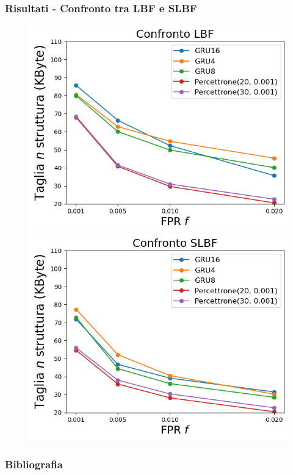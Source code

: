 \documentclass{beamer}
\begin{document}
\begin{frame}
\frametitle{Risultati - Confronto tra LBF e SLBF}
\begin{figure}[htbp]
    \centering
    \begin{minipage}{0.50\textwidth}
    \centering
    \includegraphics[width=\textwidth]{immagini/7/LBF/Confronto.png}
    \end{minipage}%
    \hfill
    \begin{minipage}{0.50\textwidth}
    \centering
    \includegraphics[width=\textwidth]{immagini/7/SLBF/Confronto.png}
    \end{minipage}%
\end{figure}
\end{frame}

\begin{frame}[allowframebreaks]
\frametitle{Bibliografia}
\printbibliography
\end{frame}
\end{document}
